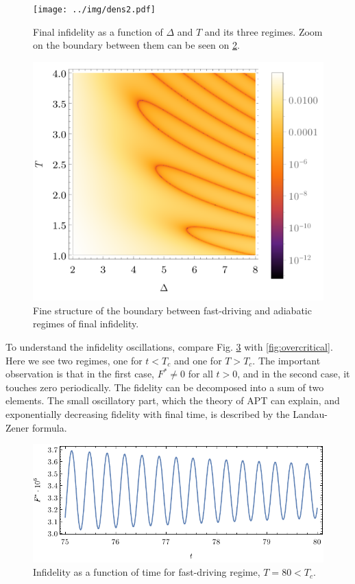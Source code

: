 \begin{figure}[h]
    \centering 
    \texttt{[image: ../img/dens2.pdf]}
    \caption{Final infidelity as a function of $\Delta$ and $T$ and its three regimes. Zoom on the boundary between them can be seen on \ref{fig:dens2Zoom}.}
    \label{fig:dens2}
\end{figure}

\vspace{-10pt}\begin{figure}[h]
    \centering 
    \includegraphics[scale=1.2]{../img/dens2Zoom.pdf}
    \caption{Fine structure of the boundary between fast-driving and adiabatic regimes of final infidelity.}
    \label{fig:dens2Zoom}
\end{figure}


\newpage
To understand the infidelity oscillations, compare Fig. \ref{fig:undercritical} with \ref{fig:overcritical}. Here we see two regimes, one for $t<T_c$ and one for $T>T_c$. The important observation is that in the first case, $F^*\neq 0$ for all $t>0$, and in the second case, it touches zero periodically. The fidelity can be decomposed into a sum of two elements. The small oscillatory part, which the theory of APT can explain, and exponentially decreasing fidelity with final time, is described by the Landau-Zener formula.

\begin{figure}[h]
    \centering
    \includegraphics[scale=1.2]{../img/undercritical.pdf}
    \caption{Infidelity as a function of time for fast-driving regime, $T=80<T_c$.}
    \label{fig:undercritical}
\end{figure}

